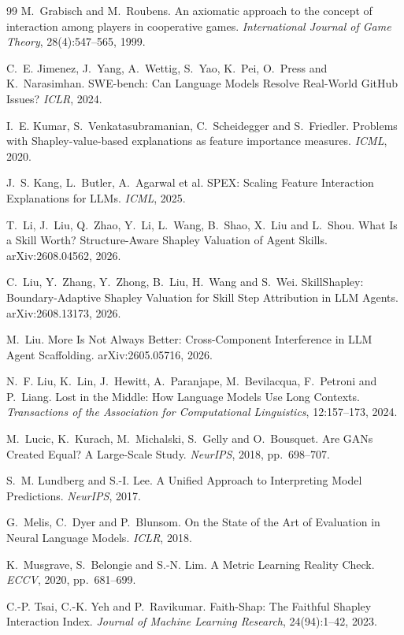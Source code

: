 \documentclass[11pt]{article}
\theoremstyle{plain}
\theoremstyle{definition}
\theoremstyle{remark}
\begin{document}
\begin{thebibliography}{99}
 M.~Grabisch and M.~Roubens. An axiomatic approach to the concept of interaction among players in cooperative games. \emph{International Journal of Game Theory}, 28(4):547--565, 1999.

 C.~E. Jimenez, J.~Yang, A.~Wettig, S.~Yao, K.~Pei, O.~Press and K.~Narasimhan. SWE-bench: Can Language Models Resolve Real-World GitHub Issues? \emph{ICLR}, 2024.

 I.~E. Kumar, S.~Venkatasubramanian, C.~Scheidegger and S.~Friedler. Problems with Shapley-value-based explanations as feature importance measures. \emph{ICML}, 2020.

 J.~S. Kang, L.~Butler, A.~Agarwal et al. SPEX: Scaling Feature Interaction Explanations for LLMs. \emph{ICML}, 2025.

 T.~Li, J.~Liu, Q.~Zhao, Y.~Li, L.~Wang, B.~Shao, X.~Liu and L.~Shou. What Is a Skill Worth? Structure-Aware Shapley Valuation of Agent Skills. arXiv:2608.04562, 2026.

 C.~Liu, Y.~Zhang, Y.~Zhong, B.~Liu, H.~Wang and S.~Wei. SkillShapley: Boundary-Adaptive Shapley Valuation for Skill Step Attribution in LLM Agents. arXiv:2608.13173, 2026.

 M.~Liu. More Is Not Always Better: Cross-Component Interference in LLM Agent Scaffolding. arXiv:2605.05716, 2026.

 N.~F. Liu, K.~Lin, J.~Hewitt, A.~Paranjape, M.~Bevilacqua, F.~Petroni and P.~Liang. Lost in the Middle: How Language Models Use Long Contexts. \emph{Transactions of the Association for Computational Linguistics}, 12:157--173, 2024.

 M.~Lucic, K.~Kurach, M.~Michalski, S.~Gelly and O.~Bousquet. Are GANs Created Equal? A Large-Scale Study. \emph{NeurIPS}, 2018, pp.~698--707.

 S.~M. Lundberg and S.-I. Lee. A Unified Approach to Interpreting Model Predictions. \emph{NeurIPS}, 2017.

 G.~Melis, C.~Dyer and P.~Blunsom. On the State of the Art of Evaluation in Neural Language Models. \emph{ICLR}, 2018.

 K.~Musgrave, S.~Belongie and S.-N. Lim. A Metric Learning Reality Check. \emph{ECCV}, 2020, pp.~681--699.

 C.-P. Tsai, C.-K. Yeh and P.~Ravikumar. Faith-Shap: The Faithful Shapley Interaction Index. \emph{Journal of Machine Learning Research}, 24(94):1--42, 2023.


\end{thebibliography}
\end{document}
